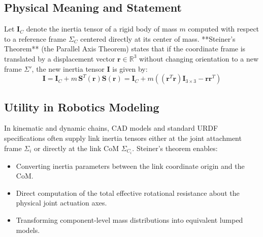 \documentclass[11pt, a4paper]{article}
\begin{document}
\subsection{Physical Meaning and Statement}
Let $\mathbf{I}_C$ denote the inertia tensor of a rigid body of mass $m$ computed with respect to a reference frame $\Sigma_C$ centered directly at its center of mass. **Steiner's Theorem** (the Parallel Axis Theorem) states that if the coordinate frame is translated by a displacement vector $\mathbf{r} \in \mathbb{R}^3$ without changing orientation to a new frame $\Sigma'$, the new inertia tensor $\mathbf{I}$ is given by:
\begin{equation}
    \mathbf{I} = \mathbf{I}_C + m \, \mathbf{S}^T(\mathbf{r}) \mathbf{S}(\mathbf{r}) = \mathbf{I}_C + m \left( (\mathbf{r}^T\mathbf{r})\mathbf{I}_{3\times 3} - \mathbf{r}\mathbf{r}^T \right)
\end{equation}

\subsection{Utility in Robotics Modeling}
In kinematic and dynamic chains, CAD models and standard URDF specifications often supply link inertia tensors either at the joint attachment frame $\Sigma_i$ or directly at the link CoM $\Sigma_{C_i}$. Steiner's theorem enables:
\begin{itemize}
    \item Converting inertia parameters between the link coordinate origin and the CoM.
    \item Direct computation of the total effective rotational resistance about the physical joint actuation axes.
    \item Transforming component-level mass distributions into equivalent lumped models.
\end{itemize}

\end{document}
